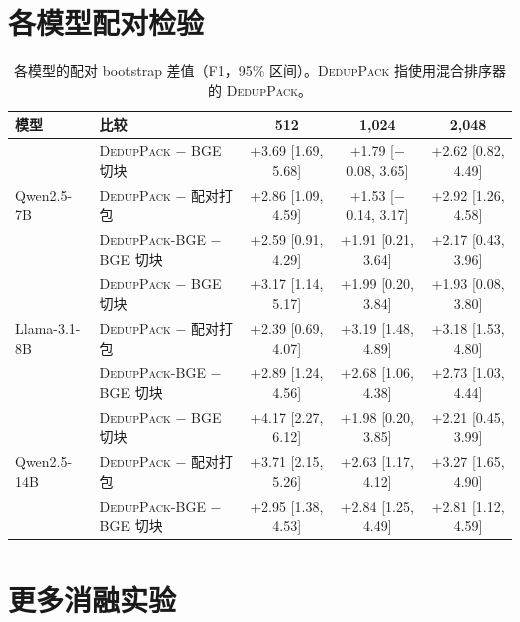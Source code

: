 \documentclass[11pt]{article}
\newcommand{\spk}{\textsc{DedupPack}}
\begin{document}
\section{各模型配对检验}
\label{app:permodel}

\begin{table}[t]
\centering
\small
\begin{tabular}{llccc}
\toprule
模型 & 比较 & 512 & 1,024 & 2,048 \\
\midrule
\multirow{3}{*}{Qwen2.5-7B}
 & \spk{} $-$ BGE 切块 & +3.69 [1.69, 5.68] & +1.79 [$-$0.08, 3.65] & +2.62 [0.82, 4.49] \\
 & \spk{} $-$ 配对打包 & +2.86 [1.09, 4.59] & +1.53 [$-$0.14, 3.17] & +2.92 [1.26, 4.58] \\
 & \spk{}-BGE $-$ BGE 切块 & +2.59 [0.91, 4.29] & +1.91 [0.21, 3.64] & +2.17 [0.43, 3.96] \\
\midrule
\multirow{3}{*}{Llama-3.1-8B}
 & \spk{} $-$ BGE 切块 & +3.17 [1.14, 5.17] & +1.99 [0.20, 3.84] & +1.93 [0.08, 3.80] \\
 & \spk{} $-$ 配对打包 & +2.39 [0.69, 4.07] & +3.19 [1.48, 4.89] & +3.18 [1.53, 4.80] \\
 & \spk{}-BGE $-$ BGE 切块 & +2.89 [1.24, 4.56] & +2.68 [1.06, 4.38] & +2.73 [1.03, 4.44] \\
\midrule
\multirow{3}{*}{Qwen2.5-14B}
 & \spk{} $-$ BGE 切块 & +4.17 [2.27, 6.12] & +1.98 [0.20, 3.85] & +2.21 [0.45, 3.99] \\
 & \spk{} $-$ 配对打包 & +3.71 [2.15, 5.26] & +2.63 [1.17, 4.12] & +3.27 [1.65, 4.90] \\
 & \spk{}-BGE $-$ BGE 切块 & +2.95 [1.38, 4.53] & +2.84 [1.25, 4.49] & +2.81 [1.12, 4.59] \\
\bottomrule
\end{tabular}
\caption{各模型的配对 bootstrap 差值（F1，95\% 区间）。\spk{} 指使用混合排序器的 \spk{}。}
\label{tab:permodel}
\end{table}

\section{更多消融实验}
\label{app:ablation}
\end{document}
